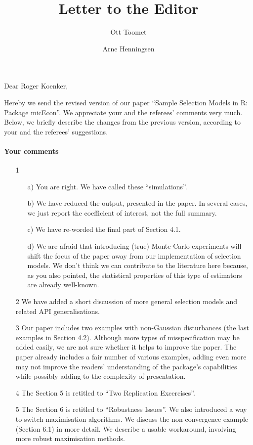 \documentclass[a4paper]{article}
\title{Letter to the Editor}
\author{Ott Toomet \and Arne Henningsen}
\begin{document}
\maketitle

Dear Roger Koenker,

\bigskip

Hereby we send the revised version of our paper ``Sample Selection
Models in R: Package micEcon''.  We appreciate your and the referees'
comments very much.  Below, we briefly describe the changes from
the previous version, according to your and the referees' suggestions.

\paragraph{Your comments}

\begin{itemize}
\item[1]
  \begin{itemize}
  \item[a)] You are right.  We have called these ``simulations''.
  \item[b)] We have reduced the output, presented in the paper.  In
    several cases, we just report the coefficient of interest, not the
    full summary.
  \item[c)] We have re-worded the final part of Section 4.1.
  \item[d)] We are afraid that introducing (true) Monte-Carlo
    experiments will shift the focus of the paper away from our
    implementation of selection models.  We don't think we can
    contribute to the literature here because, as you also pointed,
    the statistical properties of this type of estimators are already
    well-known.
  \end{itemize}
\item[2] We have added a short discussion of more general selection
  models and related API generalisations.
\item[3] Our paper includes two examples with non-Gaussian
  disturbances (the last examples in Section 4.2).  Although more
  types of misspecification may be added easily, we are not sure
  whether it helps to improve the paper.  The paper already includes a
  fair number of various examples, adding even more may not improve
  the readers' understanding of the package's capabilities while
  possibly adding to the complexity of presentation.
\item[4] The Section 5 is retitled to ``Two Replication Excercises''.
\item[5] The Section 6 is retitled to ``Robustness Issues''.  We also
  introduced a way to switch maximisation algorithms.  We discuss the
  non-convergence example (Section 6.1) in more detail.  We describe a
  usable workaround, involving more robust maximisation methods.
\end{itemize}
\end{document}
